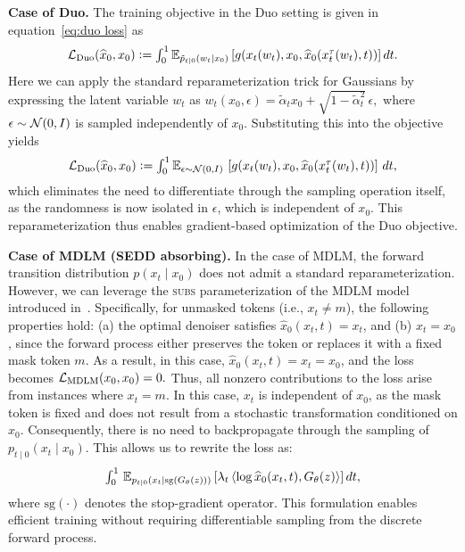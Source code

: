 \textbf{Case of Duo.} The training objective in the Duo setting is given in equation~\eqref{eq:duo loss} as
\begin{gather}
  \textstyle \mathcal{L}_{\text{Duo}}(\widehat{x}_0, x_0)\vcentcolon=
  \int_0^1 \mathbb{E}_{\tilde{p}_{t\mid 0}(w_t\mid x_0)} \left[g(x_t(w_t),x_0, \widehat{x}_0(x_t^{\tau}(w_t), t))\right]dt. \nonumber
\end{gather}
Here we can apply the standard reparameterization trick for Gaussians by expressing the latent variable $w_t$ as
$
  \textstyle w_t(x_0, \epsilon) = \tilde{\alpha}_t x_0 + \sqrt{1 - \tilde{\alpha}_t^2} \, \epsilon,
  $
where $\epsilon \sim \mathcal{N}(0, I)$ is sampled independently of $x_0$. Substituting this into the objective yields
\begin{gather}
  \textstyle \mathcal{L}_{\text{Duo}}(\widehat{x}_0, x_0)\vcentcolon=
  \int_0^1 \mathbb{E}_{\epsilon \sim \mathcal{N}(0, I)} \, \left[g(x_t(w_t),x_0, \widehat{x}_0(x_t^{\tau}(w_t), t))\right] \, dt,
\end{gather}
which eliminates the need to differentiate through the sampling operation itself, as the randomness is now isolated in $\epsilon$, which is independent of $x_0$. This reparameterization thus enables gradient-based optimization of the Duo objective.


\textbf{Case of MDLM (SEDD absorbing).} In the case of MDLM, the forward transition distribution $p(x_t \mid x_0)$ does not admit a standard reparameterization. However, we can leverage the \textsc{subs} parameterization of the MDLM model introduced in~\citep[see Section 3.2.3]{sahoo2024simple}. Specifically, for unmasked tokens (i.e., $x_t \neq m$), the following properties hold: (a) the optimal denoiser satisfies $\widehat{x}_0(x_t, t) = x_t$, and (b) $x_t = x_0$, since the forward process either preserves the token or replaces it with a fixed mask token $m$. As a result, in this case, $\widehat{x}_0(x_t, t) = x_t = x_0$, and the loss becomes $\mathcal{L}_{\text{MDLM}}(x_0, x_0) = 0.$
Thus, all nonzero contributions to the loss arise from instances where $x_t = m$. In this case, $x_t$ is independent of $x_0$, as the mask token is fixed and does not result from a stochastic transformation conditioned on $x_0$. Consequently, there is no need to backpropagate through the sampling of $p_{t \mid 0}(x_t \mid x_0)$. This allows us to rewrite the loss as:
\begin{gather}
  \textstyle \int_0^1 \, \mathbb{E}_{p_{t \mid 0}(x_t \mid \text{sg}(G_{\theta}(z)))} \left[
  \lambda_t \, \langle \log \widehat{x}_0(x_t, t), G_{\theta}(z) \rangle
  \right] dt,
  \nonumber
\end{gather}
where $\text{sg}(\cdot)$ denotes the stop-gradient operator. This formulation enables efficient training without requiring differentiable sampling from the discrete forward process.


